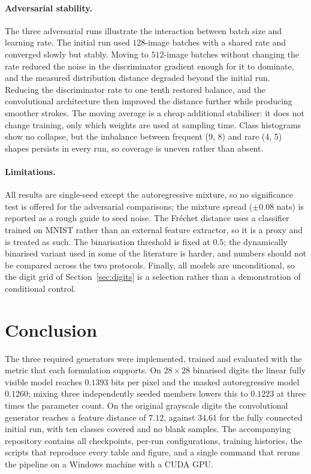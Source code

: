 \documentclass[11pt,a4paper]{article}
\begin{document}
\paragraph{Adversarial stability.}
The three adversarial runs illustrate the interaction between batch size and learning rate.
The initial run used $128$-image batches with a shared rate and converged slowly but stably.
Moving to $512$-image batches without changing the rate reduced the noise in the discriminator
gradient enough for it to dominate, and the measured distribution distance degraded beyond the
initial run. Reducing the discriminator rate to one tenth restored balance, and the convolutional architecture
then improved the distance further while producing smoother strokes. The moving average is a
cheap additional stabiliser: it does not change training, only which weights are used at
sampling time.
Class histograms show no collapse, but the imbalance between frequent (9, 8) and rare (4, 5)
shapes persists in every run, so coverage is uneven rather than absent.

\paragraph{Limitations.}
All results are single-seed except the autoregressive mixture, so no significance test is
offered for the adversarial comparisons; the mixture spread ($\pm0.08$ nats) is reported as a
rough guide to seed noise. The Fr\'echet distance uses a classifier trained on MNIST rather
than an external feature extractor, so it is a proxy and is treated as such. The binarisation
threshold is fixed at $0.5$; the dynamically binarised variant used in some of the literature
is harder, and numbers should not be compared across the two protocols. Finally, all models
are unconditional, so the digit grid of Section~\ref{sec:digits} is a selection rather than a
demonstration of conditional control.

\section{Conclusion}

The three required generators were implemented, trained and evaluated with the metric that
each formulation supports. On $28\times28$ binarised digits the linear fully visible model
reaches $0.1393$ bits per pixel and the masked autoregressive model $0.1260$; mixing three
independently seeded members lowers this to $0.1223$ at three times the parameter count. On
the original grayscale digits the convolutional generator reaches a feature distance of
$7.12$, against $34.61$ for the fully connected initial run, with ten classes covered and no
blank samples. The accompanying repository contains all checkpoints, per-run configurations,
training histories, the scripts that reproduce every table and figure, and a single command
that reruns the pipeline on a Windows machine with a CUDA GPU.
\end{document}
